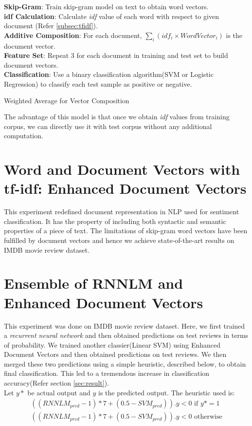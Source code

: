\LinesNumbered
\begin{algorithm}[H]
\large
\textbf{Skip-Gram}: Train skip-gram model on text to obtain word vectors.\\
\textbf{idf Calculation}: Calculate \emph{idf} value of each word with respect to given document (Refer \ref{subsec:tfidf}).\\
\textbf{Additive Composition}: For each document, $\sum_{i}(idf_i \times WordVector_i)$ is the document vector.\\
\textbf{Feature Set}: Repeat 3 for each document in training and test set to build document vectors.\\
\textbf{Classification}: Use a binary classification algorithm(SVM or Logistic Regression) to classify each test sample as positive or negative.
\caption{Weighted Average for Vector Composition}\label{alg:weighted_average}
\end{algorithm}
The advantage of this model is that once we obtain \emph{idf} values from training corpus, we can directly use it with test corpus without any additional computation.

\section{Word and Document Vectors with tf-idf: Enhanced Document Vectors}
This experiment redefined document representation in NLP used for sentiment classification. It has the property of including both syntactic and semantic properties of a piece of text. The limitations of skip-gram word vectors have been fulfilled by document vectors and hence we achieve state-of-the-art results on IMDB movie review dataset.

\section{Ensemble of RNNLM and Enhanced Document Vectors}
This experiment was done on IMDB movie review dataset. Here, we first trained a \emph{recurrent neural network} and then obtained predictions on test reviews in terms of probability. We trained another classier(Linear SVM) using Enhanced Document Vectors and then obtained predictions on test reviews. We then merged these two predictions using a simple heuristic, described below, to obtain final classification. This led to a tremendous increase in classification accuracy(Refer section \ref{sec:result}).\\
Let $y*$ be actual output and $y$ is the predicted output. The heuristic used is:
\begin{align}
((RNNLM_{pred}-1)*7+(0.5-SVM_{pred})).y<0 \text{  if } y*=1\\
((RNNLM_{pred}-1)*7+(0.5-SVM_{pred})).y<0 \text{  otherwise}
\end{align}

